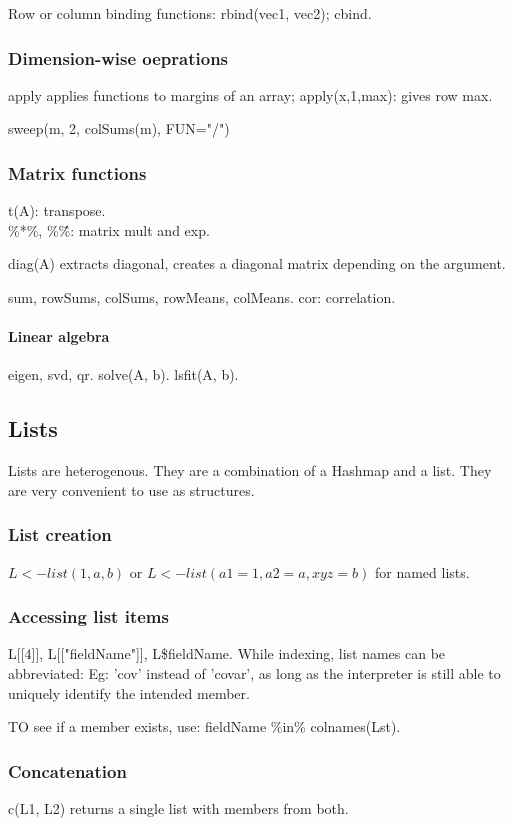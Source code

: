 \documentclass[oneside, article]{memoir}
\begin{document}
Row or column binding functions: rbind(vec1, vec2); cbind.

\subsubsection{Dimension-wise oeprations}
apply applies functions to margins of an array; apply(x,1,max): gives row max.

sweep(m, 2, colSums(m), FUN="/")

\subsubsection{Matrix functions}
t(A): transpose.\\
\%*\%, \%\^\%: matrix mult and exp.

diag(A) extracts diagonal, creates a diagonal matrix depending on the argument.

sum, rowSums, colSums, rowMeans, colMeans. cor: correlation.

\paragraph{Linear algebra}
eigen, svd, qr. solve(A, b). lsfit(A, b).

\subsection{Lists}
Lists are heterogenous. They are a combination of a Hashmap and a list. They are very convenient to use as structures.

\subsubsection{List creation}
$L <-list(1, a, b)$ or $L <-list(a1= 1, a2 = a, xyz = b)$ for named lists.

\subsubsection{Accessing list items}
L[[4]], L[["fieldName"]], L\$fieldName. While indexing, list names can be abbreviated: Eg: 'cov' instead of 'covar', as long as the interpreter is still able to uniquely identify the intended member.

TO see if a member exists, use: fieldName \%in\% colnames(Lst).

\subsubsection{Concatenation}
c(L1, L2) returns a single list with members from both.
\end{document}
